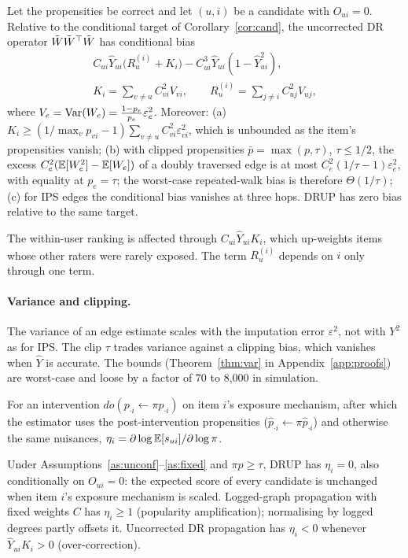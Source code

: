 \begin{theorem}\label{thm:lower}
Let the propensities be correct and let $(u,i)$ be a candidate with $O_{ui}=0$.
Relative to the conditional target of Corollary~\ref{cor:cand}, the
uncorrected DR operator $\tilde W\tilde W^\top\tilde W$ has conditional bias
\begin{gather*}
C_{ui}\hat Y_{ui}\big(R_u^{(i)}+K_i\big)-C_{ui}^3\hat Y_{ui}(1-\hat Y_{ui}^2),\\
K_i=\sum_{v\neq u}C_{vi}^2V_{vi},\qquad R_u^{(i)}=\sum_{j\neq i}C_{uj}^2V_{uj},
\end{gather*}
where $V_e=\operatorname{Var}(W_e)=\frac{1-p_e}{p_e}\varepsilon_e^2$. Moreover:
(a) $K_i\ge(1/\max_vp_{vi}-1)\sum_{v\neq u}C_{vi}^2\varepsilon_{vi}^2$, which is unbounded
as the item's propensities vanish;
(b) with clipped propensities $\bar p=\max(p,\tau)$, $\tau\le1/2$, the excess
$C_e^2(\mathbb{E}[W_e^2]-\mathbb{E}[W_e])$ of a doubly traversed edge is at most
$C_e^2(1/\tau-1)\varepsilon_e^2$, with equality at $p_e=\tau$; the worst-case
repeated-walk bias is therefore $\Theta(1/\tau)$;
(c) for IPS edges the conditional bias vanishes at three hops.
DRUP has zero bias relative to the same target.
\end{theorem}
The within-user ranking is affected through $C_{ui}\hat Y_{ui}K_i$, which
up-weights items whose other raters were rarely exposed. The term $R_u^{(i)}$ depends on
$i$ only through one term.

\paragraph{Variance and clipping.} The variance of an edge estimate scales with the
imputation error $\varepsilon^2$, not with $Y^2$ as for IPS. The clip $\tau$ trades
variance against a clipping bias, which vanishes when $\hat Y$ is accurate. The bounds
(Theorem~\ref{thm:var} in Appendix~\ref{app:proofs}) are worst-case and loose by a factor of 70 to
8{,}000 in simulation.

\begin{definition}\label{def:elast}
For an intervention $do(p_{\cdot i}\leftarrow\pi p_{\cdot i})$ on item $i$'s
exposure mechanism, after which the estimator uses the post-intervention
propensities ($\hat p_{\cdot i}\leftarrow\pi\hat p_{\cdot i}$) and otherwise the same
nuisances, $\eta_i=\partial\log\mathbb{E}[s_{ui}]/\partial\log\pi$.
\end{definition}

\begin{theorem}\label{thm:fair}
Under Assumptions~\ref{as:unconf}--\ref{as:fixed} and $\pi p\ge\tau$, DRUP has
$\eta_i=0$, also conditionally on $O_{ui}=0$: the expected score of every
candidate is unchanged when item $i$'s exposure mechanism is scaled.
Logged-graph propagation with fixed weights $C$ has $\eta_i\ge1$ (popularity
amplification); normalising by logged degrees partly offsets it.
Uncorrected DR propagation has $\eta_i<0$ whenever $\hat Y_{ui}K_i>0$
(over-correction).
\end{theorem}

